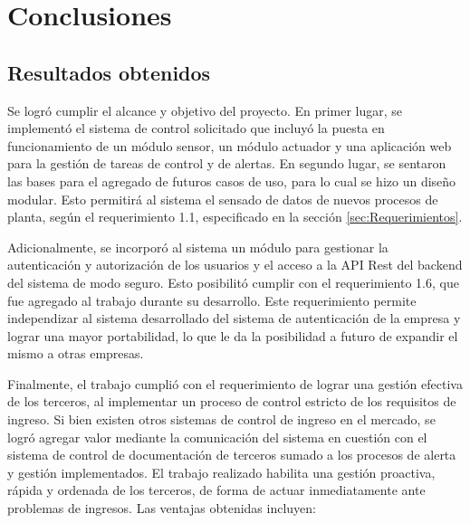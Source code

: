 
\chapter{Conclusiones} %

\label{Chapter5} %




\section{Resultados obtenidos}

Se logró cumplir el alcance y objetivo del proyecto. En primer lugar, se implementó el sistema de control solicitado que incluyó la puesta en funcionamiento de un módulo sensor, un módulo actuador y una aplicación web para la gestión de tareas de control y de alertas. En segundo lugar, se sentaron las bases para el agregado de futuros casos de uso, para lo cual se hizo un diseño modular. Esto permitirá al sistema el sensado de datos de nuevos procesos de planta, según el requerimiento 1.1, especificado en la sección \ref{sec:Requerimientos}.

Adicionalmente, se incorporó al sistema un módulo para gestionar la autenticación y autorización de los usuarios y el acceso a la API Rest del backend del sistema de modo seguro. Esto posibilitó cumplir con el requerimiento 1.6, que fue agregado al trabajo durante su desarrollo. Este requerimiento permite independizar al sistema desarrollado del sistema de autenticación de la empresa y lograr una mayor portabilidad, lo que le da la posibilidad a futuro de expandir el mismo a otras empresas.

Finalmente, el trabajo cumplió con el requerimiento de lograr una gestión efectiva de los terceros, al implementar un proceso de control estricto de los requisitos de ingreso. Si bien existen otros sistemas de control de ingreso en el mercado, se logró agregar valor mediante la comunicación del sistema en cuestión con el sistema de control de documentación de terceros sumado a los procesos de alerta y gestión implementados. El trabajo realizado habilita una gestión proactiva, rápida y ordenada de los terceros, de forma de actuar inmediatamente ante problemas de ingresos. Las ventajas obtenidas incluyen:

